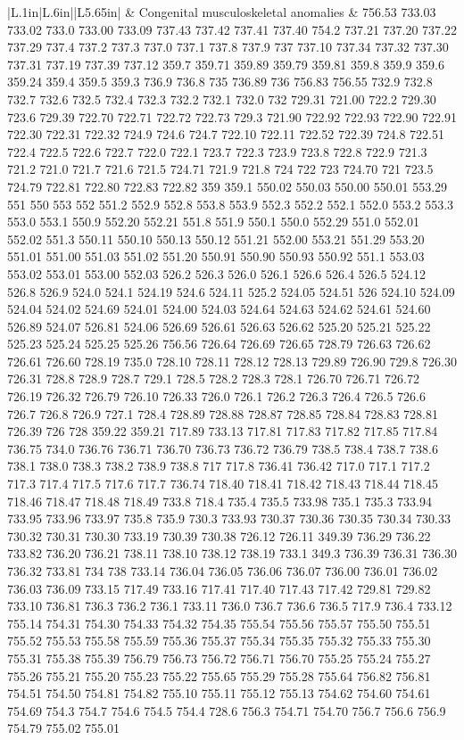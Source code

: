 \begin{longtable}{|L{.1in}|L{.6in}||L{5.65in}|}
    & Congenital musculoskeletal anomalies &  756.53 733.03 733.02 733.0 733.00 733.09 737.43 737.42 737.41 737.40 754.2 737.21 737.20 737.22 737.29 737.4 737.2 737.3 737.0 737.1 737.8 737.9 737 737.10 737.34 737.32 737.30 737.31 737.19 737.39 737.12 359.7 359.71 359.89 359.79 359.81 359.8 359.9 359.6 359.24 359.4 359.5 359.3 736.9 736.8 735 736.89 736 756.83 756.55 732.9 732.8 732.7 732.6 732.5 732.4 732.3 732.2 732.1 732.0 732 729.31 721.00 722.2 729.30 723.6 729.39 722.70 722.71 722.72 722.73 729.3 721.90 722.92 722.93 722.90 722.91 722.30 722.31 722.32 724.9 724.6 724.7 722.10 722.11 722.52 722.39 724.8 722.51 722.4 722.5 722.6 722.7 722.0 722.1 723.7 722.3 723.9 723.8 722.8 722.9 721.3 721.2 721.0 721.7 721.6 721.5 724.71 721.9 721.8 724 722 723 724.70 721 723.5 724.79 722.81 722.80 722.83 722.82 359 359.1 550.02 550.03 550.00 550.01 553.29 551 550 553 552 551.2 552.9 552.8 553.8 553.9 552.3 552.2 552.1 552.0 553.2 553.3 553.0 553.1 550.9 552.20 552.21 551.8 551.9 550.1 550.0 552.29 551.0 552.01 552.02 551.3 550.11 550.10 550.13 550.12 551.21 552.00 553.21 551.29 553.20 551.01 551.00 551.03 551.02 551.20 550.91 550.90 550.93 550.92 551.1 553.03 553.02 553.01 553.00 552.03 526.2 526.3 526.0 526.1 526.6 526.4 526.5 524.12 526.8 526.9 524.0 524.1 524.19 524.6 524.11 525.2 524.05 524.51 526 524.10 524.09 524.04 524.02 524.69 524.01 524.00 524.03 524.64 524.63 524.62 524.61 524.60 526.89 524.07 526.81 524.06 526.69 526.61 526.63 526.62 525.20 525.21 525.22 525.23 525.24 525.25 525.26 756.56 726.64 726.69 726.65 728.79 726.63 726.62 726.61 726.60 728.19 735.0 728.10 728.11 728.12 728.13 729.89 726.90 729.8 726.30 726.31 728.8 728.9 728.7 729.1 728.5 728.2 728.3 728.1 726.70 726.71 726.72 726.19 726.32 726.79 726.10 726.33 726.0 726.1 726.2 726.3 726.4 726.5 726.6 726.7 726.8 726.9 727.1 728.4 728.89 728.88 728.87 728.85 728.84 728.83 728.81 726.39 726 728 359.22 359.21 717.89 733.13 717.81 717.83 717.82 717.85 717.84 736.75 734.0 736.76 736.71 736.70 736.73 736.72 736.79 738.5 738.4 738.7 738.6 738.1 738.0 738.3 738.2 738.9 738.8 717 717.8 736.41 736.42 717.0 717.1 717.2 717.3 717.4 717.5 717.6 717.7 736.74 718.40 718.41 718.42 718.43 718.44 718.45 718.46 718.47 718.48 718.49 733.8 718.4 735.4 735.5 733.98 735.1 735.3 733.94 733.95 733.96 733.97 735.8 735.9 730.3 733.93 730.37 730.36 730.35 730.34 730.33 730.32 730.31 730.30 733.19 730.39 730.38 726.12 726.11 349.39 736.29 736.22 733.82 736.20 736.21 738.11 738.10 738.12 738.19 733.1 349.3 736.39 736.31 736.30 736.32 733.81 734 738 733.14 736.04 736.05 736.06 736.07 736.00 736.01 736.02 736.03 736.09 733.15 717.49 733.16 717.41 717.40 717.43 717.42 729.81 729.82 733.10 736.81 736.3 736.2 736.1 733.11 736.0 736.7 736.6 736.5 717.9 736.4 733.12 755.14 754.31 754.30 754.33 754.32 754.35 755.54 755.56 755.57 755.50 755.51 755.52 755.53 755.58 755.59 755.36 755.37 755.34 755.35 755.32 755.33 755.30 755.31 755.38 755.39 756.79 756.73 756.72 756.71 756.70 755.25 755.24 755.27 755.26 755.21 755.20 755.23 755.22 755.65 755.29 755.28 755.64 756.82 756.81 754.51 754.50 754.81 754.82 755.10 755.11 755.12 755.13 754.62 754.60 754.61 754.69 754.3 754.7 754.6 754.5 754.4 728.6 756.3 754.71 754.70 756.7 756.6 756.9 754.79 755.02 755.01 
\end{longtable}
